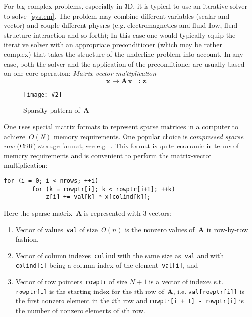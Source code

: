 \documentclass[12pt]{article}
\newcommand{\includegraphicsw}[2][1.]{\texttt{[image: \#2]}}
\newcommand{\vect}[1]{\boldsymbol{\mathbf{#1}}}
\newcommand{\dimSize}{N}
\begin{document}
For big complex problems, especially in 3D, it is typical to use an iterative solver to solve~\eqref{system}. The problem may combine different variables (scalar and vector) and couple different physics (e.g. electromagnetics and fluid flow, fluid-structure interaction and so forth); In this case one would typically equip the iterative solver with an appropriate preconditioner (which may be rather complex) that takes the structure of the underline problem into account. In any case, both the solver and the application of the preconditioner are usually based on one core operation: \textit{Matrix-vector multiplication}
\begin{equation}\label{mv}
	\vect x \mapsto \vect A\,\vect x \eqqcolon \vect z.
\end{equation}

\begin{figure}[H]
	\centering
	\includegraphicsw[.4]{sparse.pdf}
	\caption{Sparsity pattern of~$\vect A$}\label{fig:sparse}
\end{figure}

One uses special matrix formats to represent sparse matrices in a computer to achieve~$O(\dimSize)$ memory requirements. One popular choice is \textit{compressed sparse row} (CSR) storage format, see e.g.~\cite{saad2003iterative}. This format is quite economic in terms of memory requirements and is convenient to perform the matrix-vector multiplication:
\begin{lstlisting}[basicstyle=\small,caption={Implementation of the sparse matrix-vector multiplication~\eqref{mv} for CSR format},label={lst:csrmv},captionpos=b]
	for (i = 0; i < nrows; ++i) 
		for (k = rowptr[i]; k < rowptr[i+1]; ++k)
			z[i] += val[k] * x[colind[k]];
\end{lstlisting}
Here the sparse matrix~$\vect A$ is represented with 3 vectors:
\begin{enumerate}
	\item Vector of values~\texttt{val} of size~$O(n)$ is the nonzero values of~$\vect A$ in row-by-row fashion,
	\item Vector of column indexes~\texttt{colind} with the same size as~\texttt{val} and with \texttt{colind[i]} being a column index of the element~\texttt{val[i]}, and 
	\item Vector of row pointers~\texttt{rowptr} of size $\dimSize + 1$ is a vector of indexes s.t. \texttt{rowptr[i]} is the starting index for the $i$th row of~$\vect A$, i.e. \texttt{val[rowptr[i]]} is the first nonzero element in the $i$th row and \texttt{rowptr[i + 1] - rowptr[i]} is the number of nonzero elements of $i$th row.
\end{enumerate}
\end{document}
